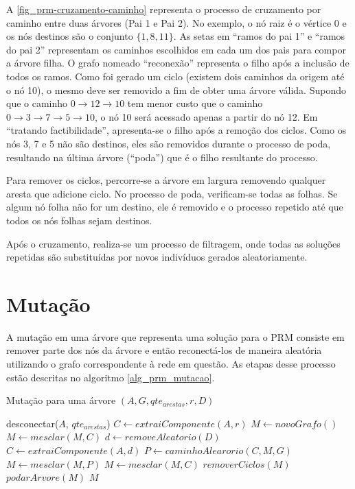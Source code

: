 A \autoref{fig_prm-cruzamento-caminho} representa o processo de cruzamento por caminho entre duas árvores (Pai 1 e Pai 2). No exemplo, o nó raiz é o vértice 0 e os nós destinos são o conjunto $\{1, 8, 11\}$. As setas em ``ramos do pai 1'' e ``ramos do pai 2'' representam os caminhos escolhidos em cada um dos pais para compor a árvore filha. O grafo nomeado ``reconexão'' representa o filho após a inclusão de todos os ramos. Como foi gerado um ciclo (existem dois caminhos da origem até o nó 10), o mesmo deve ser removido a fim de obter uma árvore válida. Supondo que o caminho $0 \rightarrow 12 \rightarrow 10$ tem menor custo que o caminho $0 \rightarrow 3 \rightarrow 7 \rightarrow 5 \rightarrow 10$, o nó 10 será acessado apenas a partir do nó 12. Em ``tratando factibilidade'', apresenta-se o filho após a remoção dos ciclos. Como os nós 3, 7 e 5 não são destinos, eles são removidos durante o processo de poda, resultando na última árvore (``poda'') que é o filho resultante do processo.

Para remover os ciclos, percorre-se a árvore em largura removendo qualquer aresta que adicione ciclo. No processo de poda, verificam-se todas as folhas. Se algum nó folha não for um destino, ele é removido e o processo repetido até que todos os nós folhas sejam destinos.

Após o cruzamento, realiza-se um processo de filtragem, onde todas as soluções repetidas são substituídas por novos indivíduos gerados aleatoriamente.

\section{Mutação}

A mutação em uma árvore que representa uma solução para o PRM consiste em remover parte dos nós da árvore e então reconectá-los de maneira aleatória utilizando o grafo correspondente à rede em questão. As etapas desse processo estão descritas no algoritmo \ref{alg_prm_mutacao}.

\begin{algorithm}
	\caption{Mutação para uma árvore $(A, G, qte_{arestas}, r, D)$}
	\label{alg_prm_mutacao}
	\begin{algorithmic}[1]
		\State desconectar($A$, $qte_{arestas}$)
		\State $C \gets extraiComponente(A, r)$
		\State $M \gets novoGrafo()$
		\State $M \gets mesclar(M, C)$
		\State $d \gets removeAleatorio(D)$
		\State $C \gets extraiComponente(A, d)$
		\State $P \gets caminhoAlearorio(C, M, G)$
		\State $M \gets mesclar(M, P)$
		\EndIf
		\State $M \gets mesclar(M, C)$
		\EndWhile
		\State $removerCiclos(M)$
		\State $podarArvore(M)$
		\State \Return $M$
	\end{algorithmic}
\end{algorithm}

